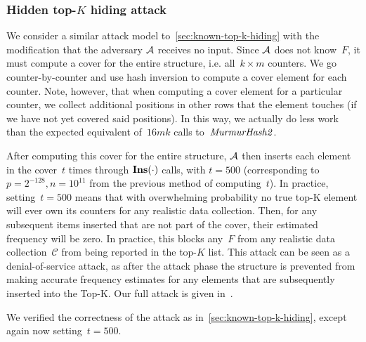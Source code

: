 \subsubsection{Hidden top-$K$ hiding attack}

We consider a similar attack model to~\cref{sec:known-top-k-hiding} with the modification that the adversary $\mathcal{A}$ receives no input.
Since $\mathcal{A}$ does not know~$F$, it must compute a cover for the entire structure, i.e. all~$k {\times} m$ counters. 
We go counter-by-counter and use hash inversion to compute a cover element for each counter. Note, however, that when computing a cover element for a particular counter, we collect additional positions in other rows that the element touches (if we have not yet covered said positions). In this way, we actually do less work than the expected equivalent of~$16mk$ calls to~$\mathit{MurmurHash2}$. 

After computing this cover for the entire structure, $\mathcal{A}$ then inserts each element in the cover~$t$ times through $\textbf{Ins}(\cdot)$ calls, with $t{=}500$ (corresponding to~$p{=}2^{-128},n{=}10^{11}$ from the previous method of computing~$t$). In practice, setting~$t{=}500$ means that with overwhelming probability no true top-K element will ever own its counters for any realistic data collection. Then, for any subsequent items inserted that are not part of the cover, their estimated frequency will be zero. In practice, this blocks any~$F$ from any realistic data collection~$\mathcal{C}$ from being reported in the top-$K$ list. This attack can be seen as a denial-of-service attack, as after the attack phase the structure is prevented from making accurate frequency estimates for any elements that are subsequently inserted into the Top-K. Our full attack is given in~.

We verified the correctness of the attack as in~\cref{sec:known-top-k-hiding}, except again now setting~$t{=}500$. 

